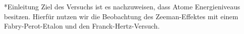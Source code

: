\documentclass[pdftex, a4paper,11pt, twoside, ngerman]{report}
\begin{document}
  
  
  
  
  
  
  
  
  \begin{chapter}*{Einleitung}
    Ziel des Versuchs ist es nachzuweisen, dass Atome Energieniveaus besitzen.
    Hierfür nutzen wir die Beobachtung des Zeeman-Effektes mit einem 
    Fabry-Perot-Etalon und den Franck-Hertz-Versuch.

    
    
  \end{chapter}
  
  \tableofcontents
  
  
  
\end{document}
